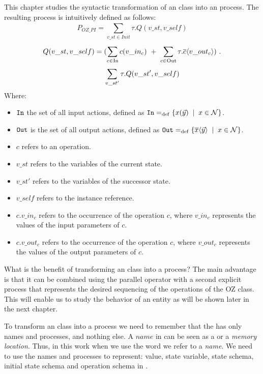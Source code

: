 This chapter studies the syntactic transformation of an \oz{} class into an \picalc{} process. The resulting process is intuitively defined as follows:
\[P_{OZ\_PI} = \sum_{v\_st\in Init}^{} \tau. Q(v\_st,v\_self)\]
\begin{equation*}
\begin{aligned}
Q(v\_st,v\_self) ={} & (\sum_{c\in \text{In}}^{} c(v\_in_{c}) \ +\ \sum_{c\in \text{Out}}^{} \tau.\out{c}{v\_out_{c}})\ . \\
      &  \sum_{v\_st'}^{} \tau.Q(v\_st',v\_self)
\end{aligned}
\end{equation*}
Where:
\begin{itemize}
\item $\mathtt{In}$ the set of all input actions, defined as $\inA\define\set[x\in\names]{\inp{x}{\vec{y}}}$.
\item $\mathtt{Out}$ is the set of all output actions, defined as $\outA\define\set[x\in\names]{\out{x}{\vec{y}}}$.
\item $c$ refers to an operation.
\item $v\_st$ refers to the variables of the current state.
\item $v\_st'$ refers to the variables of the successor state.
\item $v\_self$ refers to the instance reference.
\item $c.v\_in_{c}$ refers to the occurrence of the operation $c$, where $v\_in_{c}$ represents the values of the input parameters of $c$.
\item $c.v\_out_{c}$ refers to the occurrence of the operation $c$, where $v\_out_{c}$ represents the values of the output parameters of $c$.
\end{itemize}

What is the benefit of transforming an \oz{} class into a \picalc{} process? The main advantage is that it can be combined using the parallel operator with a second explicit \picalc{} process that represents the desired sequencing of the operations of the OZ class. This will enable us to study the behavior of an entity as will be shown later in the next chapter.

To transform an \oz{} class into a \picalc{} process we need to remember that the \picalc{} has only names and processes, and nothing else. A $name$ in \picalc{} can be seen as a  or a \textit{memory location}. Thus, in this work when we use the word  we refer to a \picalc{} \textit{name}. We need to use the names and processes to represent: value, state variable, state schema, initial state schema and operation schema in \picalc{}.

